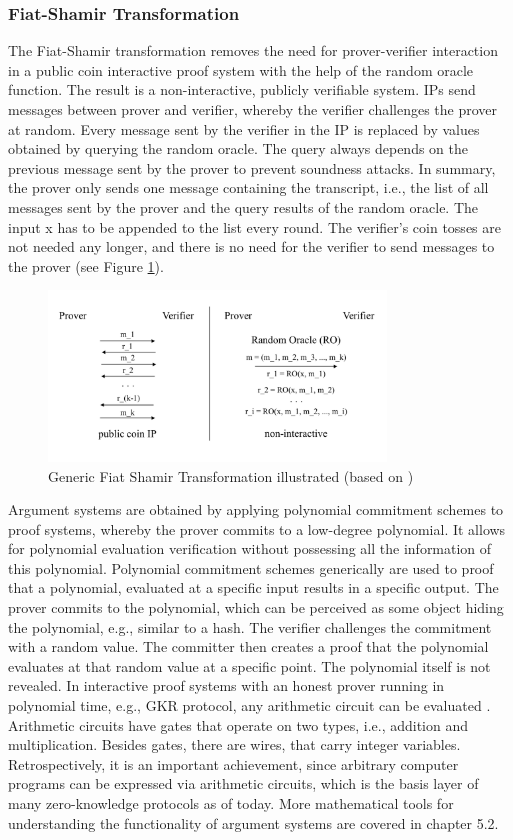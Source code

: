 \subsubsection{Fiat-Shamir Transformation}
The Fiat-Shamir transformation \citep{ROMFiat1986HowTP} removes the need for prover-verifier interaction in a public coin interactive proof system with the help of the random oracle function. The result is a non-interactive, publicly verifiable system. IPs send messages between prover and verifier, whereby the verifier challenges the prover at random. Every message sent by the verifier in the IP is replaced by values obtained by querying the random oracle. The query always depends on the previous message sent by the prover to prevent soundness attacks. In summary, the prover only sends one message containing the transcript, i.e., the list of all messages sent by the prover and the query results of the random oracle. The input x has to be appended to the list every round. The verifier's coin tosses are not needed any longer, and there is no need for the verifier to send messages to the prover (see Figure \ref{fig:FST}).

\begin{figure}[hbt]
	\centering
		\includegraphics[width=0.8\textwidth]{Pictures/FST.png}
	\caption{Generic Fiat Shamir Transformation illustrated (based on \citet{Thaler})}
	\label{fig:FST}
\end{figure}
Argument systems are obtained by applying polynomial commitment schemes to proof systems, whereby the prover commits to a low-degree polynomial. It allows for polynomial evaluation verification without possessing all the information of this polynomial.  Polynomial commitment schemes generically are used to proof that a polynomial, evaluated at a specific input results in a specific output. The prover commits to the polynomial, which can be perceived as some object hiding the polynomial, e.g., similar to a hash. The verifier challenges the commitment with a random value. The committer then creates a proof that the polynomial evaluates at that random value at a specific point. The polynomial itself is not revealed. In interactive proof systems with an honest prover running in polynomial time, e.g., GKR protocol, any arithmetic circuit can be evaluated \citep{GKR10.1145/1374376.1374396}. Arithmetic circuits have gates that operate on two types, i.e., addition and multiplication. Besides gates, there are wires, that carry integer variables. Retrospectively, it is an important achievement, since arbitrary computer programs can be expressed via arithmetic circuits, which is the basis layer of many zero-knowledge protocols as of today. More mathematical tools for understanding the functionality of argument systems are covered in chapter 5.2.
